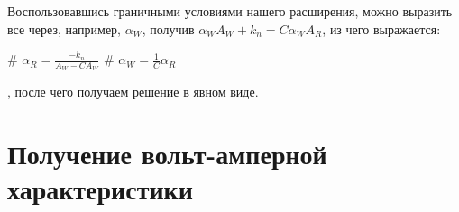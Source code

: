 Воспользовавшись граничными условиями нашего расширения, можно выразить все через, например, $\alpha_W$, получив $\alpha_W A_W + k_n = C \alpha_W A_R$, из чего выражается:
\begin{ilist}
# $\alpha_R = \frac{-k_n}{A_W - C A_W}$
# $\alpha_W = \frac{1}{C} \alpha_R$
\end{ilist}
, после чего получаем решение в явном виде.


\section{Получение вольт-амперной характеристики}

